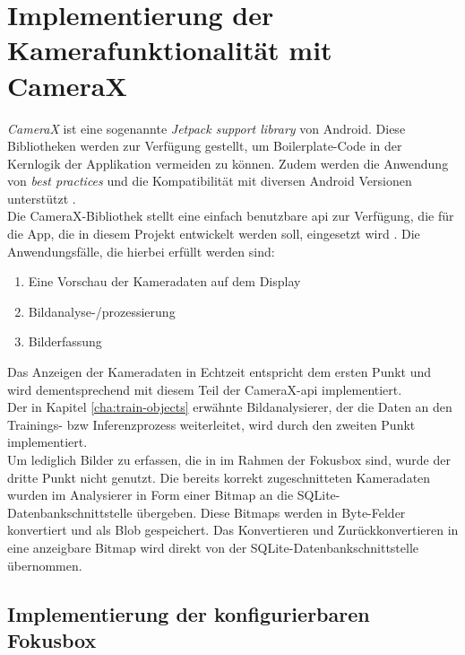 \documentclass[oneside]{ausarbeitung}
\begin{document}
\section{Implementierung der Kamerafunktionalität mit CameraX}
\textit{CameraX} ist eine sogenannte \textit{Jetpack support library} von Android. Diese Bibliotheken werden zur Verfügung gestellt, um Boilerplate-Code in der Kernlogik der Applikation vermeiden zu können. Zudem werden die Anwendung von \textit{best practices} und die Kompatibilität mit diversen Android Versionen unterstützt \cite{android:jetpack}.\\
Die CameraX-Bibliothek stellt eine einfach benutzbare \ac{api} zur Verfügung, die für die App, die in diesem Projekt entwickelt werden soll, eingesetzt wird \cite{android:camerax}. Die Anwendungsfälle, die hierbei erfüllt werden sind:
\begin{enumerate}
	\item Eine Vorschau der Kameradaten auf dem Display
	\item Bildanalyse-/prozessierung
	\item Bilderfassung
\end{enumerate}
Das Anzeigen der Kameradaten in Echtzeit entspricht dem ersten Punkt und wird dementsprechend mit diesem Teil der CameraX-\ac{api} implementiert.\\
Der in Kapitel \ref{cha:train-objects} erwähnte Bildanalysierer, der die Daten an den Trainings- bzw Inferenzprozess weiterleitet, wird durch den zweiten Punkt implementiert.\\
Um lediglich Bilder zu erfassen, die in im Rahmen der Fokusbox sind, wurde der dritte Punkt nicht genutzt. Die bereits korrekt zugeschnitteten Kameradaten wurden im Analysierer in Form einer Bitmap an die SQLite-Datenbankschnittstelle übergeben. Diese Bitmaps werden in Byte-Felder konvertiert und als Blob gespeichert. Das Konvertieren und Zurückkonvertieren in eine anzeigbare Bitmap wird direkt von der SQLite-Datenbankschnittstelle übernommen.
\subsection{Implementierung der konfigurierbaren Fokusbox}
\end{document}
